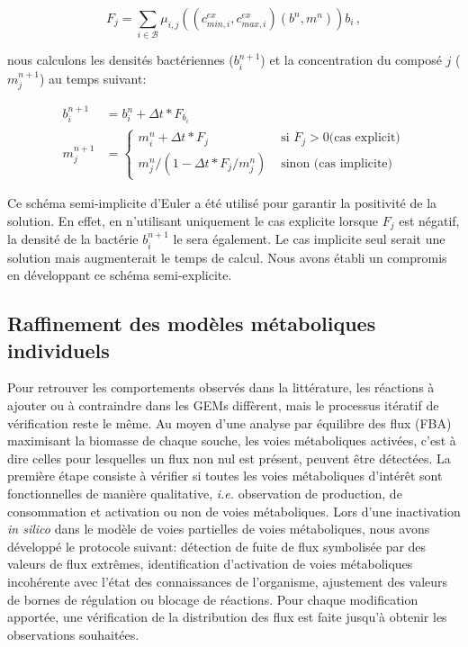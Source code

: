 \[ F_j=\sum_{i \in \mathcal{B}} {\mu}_{i,j}\left((c^{ex}_{min,i},c^{ex}_{max,i})(b^n,m^n)\right) b_i \,,\]

nous calculons les densités bactériennes ($b_i^{n+1}$) et la concentration du composé $j$ ($m_j^{n+1}$) au temps suivant:

\begin{align*}
b_i^{n+1}& = b_i^n+\Delta t* F_{b_i} \\
m_j^{n+1}& = \begin{cases} m_i^n+\Delta t* F_{j} & \text{ si } F_j>0 \text{(cas explicit)}\\
m_j^n/(1-\Delta t * F_j/m_j^n) & \text{ sinon (cas implicite)}
\end{cases}
\end{align*}

Ce schéma semi-implicite d'Euler a été utilisé pour garantir la positivité de la solution. En effet, en n'utilisant uniquement le cas explicite lorsque $F_j$ est négatif, la densité de la bactérie $b_i^{n+1}$ le sera également. Le cas implicite seul serait une solution mais augmenterait le temps de calcul. Nous avons établi un compromis en développant ce schéma semi-explicite.

\subsection{Raffinement des modèles métaboliques individuels}
Pour retrouver les comportements observés dans la littérature, les réactions à ajouter ou à contraindre dans les GEMs diffèrent, mais le processus itératif de vérification reste le même. Au moyen d'une analyse par équilibre des flux (FBA) \citep{Orth2010} maximisant la biomasse de chaque souche, les voies métaboliques activées, c'est à dire celles pour lesquelles un flux non nul est présent, peuvent être détectées. La première étape consiste à vérifier si toutes les voies métaboliques d'intérêt sont fonctionnelles de manière qualitative, \textit{i.e.} observation de production, de consommation et activation ou non de voies métaboliques. Lors d'une inactivation \textit{in silico} dans le modèle de voies partielles de voies métaboliques, nous avons développé le protocole suivant: détection de fuite de flux symbolisée par des valeurs de flux extrêmes, identification d'activation de voies métaboliques incohérente avec l'état des connaissances de l'organisme, ajustement des valeurs de bornes de régulation ou blocage de réactions. Pour chaque modification apportée, une vérification de la distribution des flux est faite jusqu'à obtenir les observations souhaitées.

